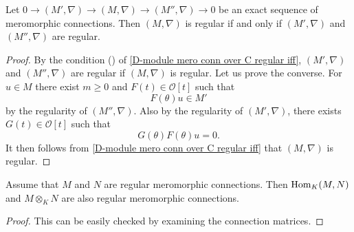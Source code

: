 \begin{proposition}\label{D-module mero conn over C regular and exact sequence}
Let $0\to (M',\nabla)\to (M,\nabla)\to (M'',\nabla)\to 0$ be an exact sequence of meromorphic connections. Then $(M,\nabla)$ is regular if and only if $(M',\nabla)$ and $(M'',\nabla)$ are regular.
\end{proposition}
\begin{proof}
By the condition () of \cref{D-module mero conn over C regular iff}, $(M',\nabla)$ and $(M'',\nabla)$ are regular if $(M,\nabla)$ is regular. Let us prove the converse. For $u\in M$ there exist $m\geq 0$ and $F(t)\in\mathscr{O}[t]$ such that
\[F(\theta)u\in M'\]
by the regularity of $(M'',\nabla)$. Also by the regularity of $(M',\nabla)$, there exists $G(t)\in\mathscr{O}[t]$ such that
\[G(\theta)F(\theta)u=0.\]
It then follows from \cref{D-module mero conn over C regular iff} that $(M,\nabla)$ is regular.
\end{proof}

\begin{proposition}\label{D-module mero conn over C regular Hom and tensor}
Assume that $M$ and $N$ are regular meromorphic connections. Then $\mathrm{Hom}_K(M,N)$ and $M\otimes_K N$ are also regular meromorphic connections.
\end{proposition}
\begin{proof}
This can be easily checked by examining the connection matrices.
\end{proof}

